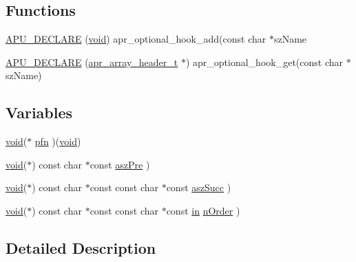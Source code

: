 \subsection*{Functions}
\begin{DoxyCompactItemize}
\item 
\hyperlink{group__APR__Util__OPT__HOOK_ga78dda4e83248b25285c108c10aec42cf}{A\+P\+U\+\_\+\+D\+E\+C\+L\+A\+RE} (\hyperlink{group__MOD__ISAPI_gacd6cdbf73df3d9eed42fa493d9b621a6}{void}) apr\+\_\+optional\+\_\+hook\+\_\+add(const char $\ast$sz\+Name
\item 
\hyperlink{group__APR__Util__OPT__HOOK_ga45886ac66d60f10a5813c3c563b099e2}{A\+P\+U\+\_\+\+D\+E\+C\+L\+A\+RE} (\hyperlink{structapr__array__header__t}{apr\+\_\+array\+\_\+header\+\_\+t} $\ast$) apr\+\_\+optional\+\_\+hook\+\_\+get(const char $\ast$sz\+Name)
\end{DoxyCompactItemize}
\subsection*{Variables}
\begin{DoxyCompactItemize}
\item 
\hyperlink{group__MOD__ISAPI_gacd6cdbf73df3d9eed42fa493d9b621a6}{void}($\ast$ \hyperlink{group__APR__Util__OPT__HOOK_gaf7c6f7f4baf83622974409f8a1005cbf}{pfn} )(\hyperlink{group__MOD__ISAPI_gacd6cdbf73df3d9eed42fa493d9b621a6}{void})
\item 
\hyperlink{group__MOD__ISAPI_gacd6cdbf73df3d9eed42fa493d9b621a6}{void}($\ast$) const char $\ast$const \hyperlink{group__APR__Util__OPT__HOOK_ga2f4032a33578e8f22ed5dfc00f977f01}{asz\+Pre} )
\item 
\hyperlink{group__MOD__ISAPI_gacd6cdbf73df3d9eed42fa493d9b621a6}{void}($\ast$) const char $\ast$const const char $\ast$const \hyperlink{group__APR__Util__OPT__HOOK_ga911d7939de58924edfe334834e1dc362}{asz\+Succ} )
\item 
\hyperlink{group__MOD__ISAPI_gacd6cdbf73df3d9eed42fa493d9b621a6}{void}($\ast$) const char $\ast$const const char $\ast$const \hyperlink{group__apr__thread__proc_ga2e46fea00cc2238744ebca5061c62bcc}{in} \hyperlink{group__APR__Util__OPT__HOOK_ga96979740ee3d327d0e03fff145daaacb}{n\+Order} )
\end{DoxyCompactItemize}


\subsection{Detailed Description}


